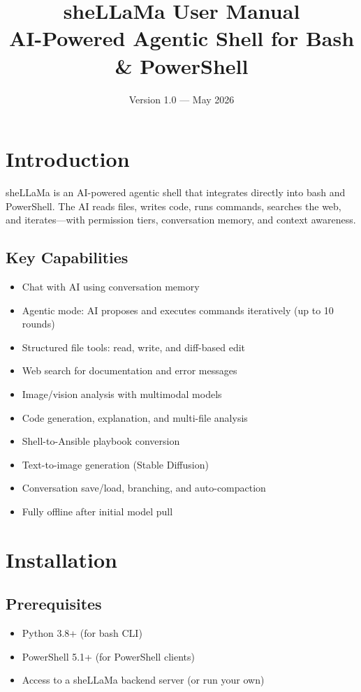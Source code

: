 \documentclass[11pt,a4paper]{article}
\title{\textbf{sheLLaMa User Manual}\\[0.5em]\large AI-Powered Agentic Shell for Bash \& PowerShell}
\author{Version 1.0 --- May 2026}
\date{}
\begin{document}
\maketitle
\tableofcontents
\newpage

\section{Introduction}

sheLLaMa is an AI-powered agentic shell that integrates directly into bash and PowerShell. The AI reads files, writes code, runs commands, searches the web, and iterates---with permission tiers, conversation memory, and context awareness.

\subsection{Key Capabilities}
\begin{itemize}
  \item Chat with AI using conversation memory
  \item Agentic mode: AI proposes and executes commands iteratively (up to 10 rounds)
  \item Structured file tools: read, write, and diff-based edit
  \item Web search for documentation and error messages
  \item Image/vision analysis with multimodal models
  \item Code generation, explanation, and multi-file analysis
  \item Shell-to-Ansible playbook conversion
  \item Text-to-image generation (Stable Diffusion)
  \item Conversation save/load, branching, and auto-compaction
  \item Fully offline after initial model pull
\end{itemize}

\section{Installation}

\subsection{Prerequisites}
\begin{itemize}
  \item Python 3.8+ (for bash CLI)
  \item PowerShell 5.1+ (for PowerShell clients)
  \item Access to a sheLLaMa backend server (or run your own)
\end{itemize}
\end{document}
